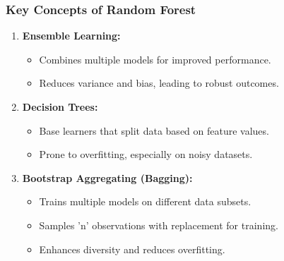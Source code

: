 \documentclass[aspectratio=169]{beamer}
\begin{document}
\begin{frame}[fragile]
    \frametitle{Key Concepts of Random Forest}
    \begin{enumerate}
        \item \textbf{Ensemble Learning:}
            \begin{itemize}
                \item Combines multiple models for improved performance.
                \item Reduces variance and bias, leading to robust outcomes.
            \end{itemize}
            
        \item \textbf{Decision Trees:}
            \begin{itemize}
                \item Base learners that split data based on feature values.
                \item Prone to overfitting, especially on noisy datasets.
            \end{itemize}
            
        \item \textbf{Bootstrap Aggregating (Bagging):}
            \begin{itemize}
                \item Trains multiple models on different data subsets.
                \item Samples 'n' observations with replacement for training.
                \item Enhances diversity and reduces overfitting.
            \end{itemize}
    \end{enumerate}
\end{frame}
\end{document}
